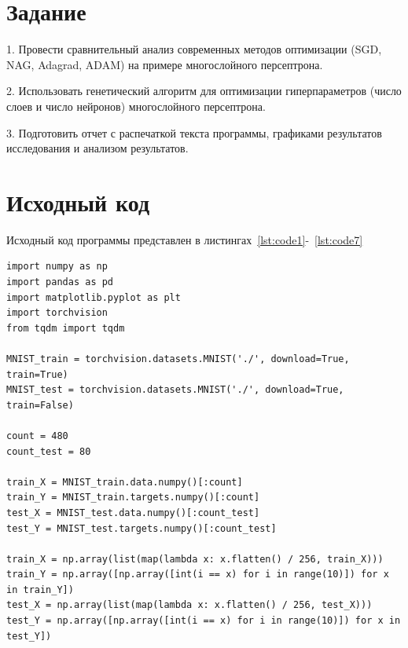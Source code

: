 \documentclass[a4paper, 14pt]{extarticle}
\begin{document}
\renewcommand{\ttdefault}{pcr}

\setlength{\tabcolsep}{3pt}
\newpage
\setcounter{page}{2}

\section{Задание}\label{Sect::task}
1. Провести сравнительный анализ современных методов оптимизации (SGD, NAG, Adagrad, ADAM) на примере многослойного персептрона.

2. Использовать генетический алгоритм для оптимизации гиперпараметров (число слоев и число нейронов) многослойного персептрона.

3. Подготовить отчет с распечаткой текста программы, графиками
результатов исследования и анализом результатов.
\newpage
\section{Исходный код}

Исходный код программы представлен в листингах~\ref{lst:code1}-~\ref{lst:code7}

\begin{lstlisting}[language={},caption={Подготовка датасета},label={lst:code1}, breaklines=true]
import numpy as np
import pandas as pd
import matplotlib.pyplot as plt
import torchvision
from tqdm import tqdm

MNIST_train = torchvision.datasets.MNIST('./', download=True, train=True)
MNIST_test = torchvision.datasets.MNIST('./', download=True, train=False)

count = 480
count_test = 80

train_X = MNIST_train.data.numpy()[:count]
train_Y = MNIST_train.targets.numpy()[:count]
test_X = MNIST_test.data.numpy()[:count_test]
test_Y = MNIST_test.targets.numpy()[:count_test]

train_X = np.array(list(map(lambda x: x.flatten() / 256, train_X)))
train_Y = np.array([np.array([int(i == x) for i in range(10)]) for x in train_Y])
test_X = np.array(list(map(lambda x: x.flatten() / 256, test_X)))
test_Y = np.array([np.array([int(i == x) for i in range(10)]) for x in test_Y])
\end{lstlisting}
\end{document}
